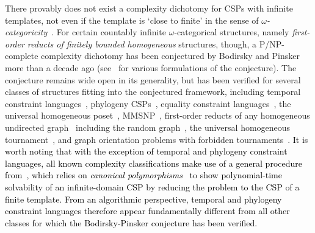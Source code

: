 \documentclass[a4paper,reqno, cleveref]{amsart}
\newcommand\jo[1]{\textcolor{black}{#1}} %
\begin{document}
There provably does not exist a complexity dichotomy for CSPs with infinite templates, not even if the template is `close to finite' in the sense of \emph{$\omega$-categoricity}~\cite{BodirskyGrohe,GJKMP-conf}. For certain countably infinite $\omega$-categorical structures, namely \emph{first-order reducts of finitely bounded homogeneous} structures, though, a P/NP-complete complexity dichotomy has been conjectured by Bodirsky and Pinsker more than a decade ago (see~\cite{BPP-projective-homomorphisms,BartoPinskerDichotomy, BKOPP,BKOPP-equations} for various formulations of the conjecture). The conjecture remains wide open in its generality, but has been verified for several classes of structures fitting into the conjectured framework, including temporal constraint languages~\cite{tcsps_conf,bodirsky_complexity_2010}, phylogeny CSPs~\cite{Phylo-Complexity-Conference,Phylo-Complexity}, equality constraint languages~\cite{ecsps},  the universal homogeneous poset~\cite{posetCSP16,posetCSP18}, MMSNP~\cite{MMSNP_conf,MMSNP-Journal}, first-order reducts of any homogeneous undirected graph~\cite{BMPP16} including the random graph~\cite{BodPin-Schaefer-both}, the universal homogeneous tournament~\cite{MottetPinskerSmooth,SmoothapproxJACM}, and graph orientation problems with forbidden tournaments~\cite{BodirskyGuzman,bittermottet_graphorientation,fellerpinsker_graphorientation}. \jo{It is worth noting that with the exception of temporal and phylogeny constraint languages, all known complexity classifications make use of a general procedure from~\cite{Bodirsky-Mottet}, which relies on \emph{canonical polymorphisms}~\cite{BPT-decidability-of-definability} to show polynomial-time solvability of an infinite-domain CSP by reducing the problem to the CSP of a finite template. From an algorithmic perspective, temporal and phylogeny constraint languages therefore appear fundamentally different from all other classes for which the Bodirsky-Pinsker conjecture has been verified. }
\end{document}
